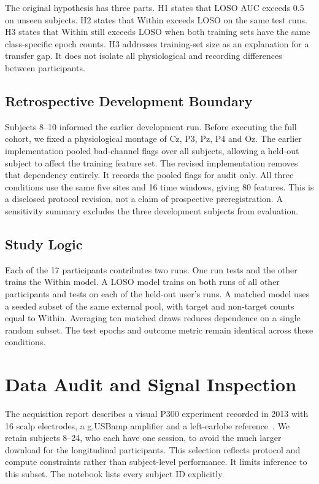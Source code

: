 \documentclass[conference]{IEEEtran}
\begin{document}
The original hypothesis has three parts. H1 states that LOSO AUC exceeds 0.5 on unseen
subjects. H2 states that Within exceeds LOSO on the same test runs. H3 states that Within
still exceeds LOSO when both training sets have the same class-specific epoch counts.
H3 addresses training-set size as an explanation for a transfer gap. It does not isolate
all physiological and recording differences between participants.

\subsection{Retrospective Development Boundary}
Subjects 8--10 informed the earlier development run. Before executing the full cohort,
we fixed a physiological montage of Cz, P3, Pz, P4 and Oz. The earlier implementation
pooled bad-channel flags over all subjects, allowing a held-out subject to affect the
training feature set. The revised implementation removes that dependency entirely.
It records the pooled flags for audit only. All three conditions use the same five
sites and 16 time windows, giving 80 features. This is a disclosed protocol revision,
not a claim of prospective preregistration. A sensitivity summary excludes the three
development subjects from evaluation.

\subsection{Study Logic}
Each of the 17 participants contributes two runs. One run tests and the other trains
the Within model. A LOSO model trains on both runs of all other participants and tests
on each of the held-out user's runs. A matched model uses a seeded subset of the same
external pool, with target and non-target counts equal to Within. Averaging ten matched
draws reduces dependence on a single random subset. The test epochs and outcome metric
remain identical across these conditions.

\clearpage
\section{Data Audit and Signal Inspection}
The acquisition report describes a visual P300 experiment recorded in 2013 with 16
scalp electrodes, a g.USBamp amplifier and a left-earlobe reference~\cite{vaineau}.
We retain subjects 8--24, who each have one session, to avoid the much larger download
for the longitudinal participants. This selection reflects protocol and compute
constraints rather than subject-level performance. It limits inference to this subset.
The notebook lists every subject ID explicitly.
\end{document}
